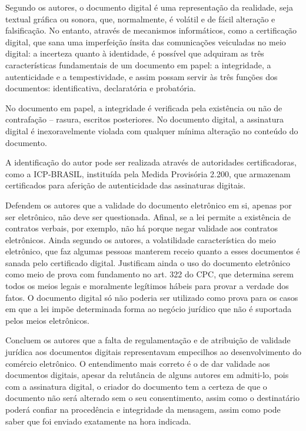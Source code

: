 	Segundo os autores, o documento digital é uma representação da realidade, seja textual gráfica ou sonora, que, normalmente, é volátil e de fácil alteração e falsificação. No entanto, através de mecanismos informáticos, como a certificação digital, que sana uma imperfeição ínsita das comunicações veiculadas no meio digital: a incerteza quanto à identidade, é possível que adquiram as três características fundamentais de um documento em papel: a integridade, a autenticidade e a tempestividade, e assim possam servir às três funções dos documentos: identificativa, declaratória e probatória. \par
	
	No documento em papel, a integridade é verificada pela existência ou não de contrafação – rasura, escritos posteriores. No documento digital, a assinatura digital é inexoravelmente violada com qualquer mínima alteração no conteúdo do documento.\par
	
	A identificação do autor pode ser realizada através de autoridades certificadoras, como a ICP-BRASIL, instituída pela Medida Provisória 2.200, que armazenam certificados para aferição de autenticidade das assinaturas digitais. \par
	
	Defendem os autores que a validade do documento eletrônico em si, apenas por ser eletrônico, não deve ser questionada. Afinal, se a lei permite a existência de contratos verbais, por exemplo, não há porque negar validade aos contratos eletrônicos. Ainda segundo os autores, a volatilidade característica do meio eletrônico, que faz algumas pessoas manterem receio quanto a esses documentos é sanada pelo certificado digital. Justificam ainda o uso do documento eletrônico como meio de prova com fundamento no art. 322 do CPC, que determina serem todos os meios legais e moralmente legítimos hábeis para provar a verdade dos fatos. O documento digital só não poderia ser utilizado como prova para os casos em que a lei impõe determinada forma ao negócio jurídico que não é suportada pelos meios eletrônicos. \par
	
	Concluem os autores que a falta de regulamentação e de atribuição de validade jurídica aos documentos digitais representavam empecilhos ao desenvolvimento do comércio eletrônico. O entendimento mais correto é o de dar validade aos documentos digitais, apesar da relutância de alguns autores em admiti-lo, pois com a assinatura digital, o criador do documento tem a certeza de que o documento não será alterado sem o seu consentimento, assim como o destinatário poderá confiar na procedência e integridade da mensagem, assim como pode saber que foi enviado exatamente na hora indicada. \par
	
